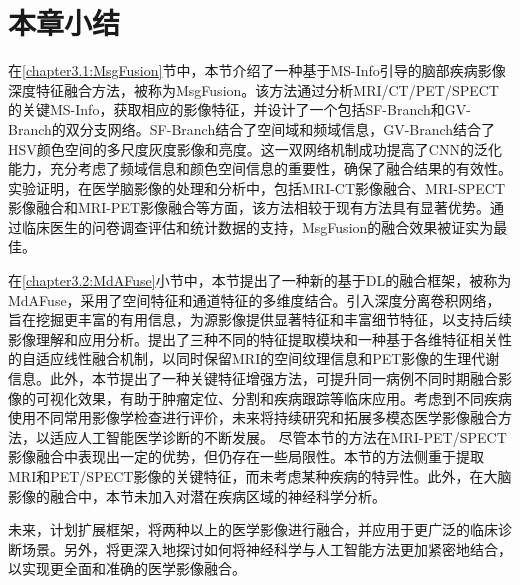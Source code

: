 \section{本章小结}
在\ref{chapter3.1:MsgFusion}节中，本节介绍了一种基于MS-Info引导的脑部疾病影像深度特征融合方法，被称为MsgFusion。该方法通过分析MRI/CT/PET/SPECT的关键MS-Info，获取相应的影像特征，并设计了一个包括SF-Branch和GV-Branch的双分支网络。SF-Branch结合了空间域和频域信息，GV-Branch结合了HSV颜色空间的多尺度灰度影像和亮度。这一双网络机制成功提高了CNN的泛化能力，充分考虑了频域信息和颜色空间信息的重要性，确保了融合结果的有效性。实验证明，在医学脑影像的处理和分析中，包括MRI-CT影像融合、MRI-SPECT影像融合和MRI-PET影像融合等方面，该方法相较于现有方法具有显著优势。通过临床医生的问卷调查评估和统计数据的支持，MsgFusion的融合效果被证实为最佳。

在\ref{chapter3.2:MdAFuse}小节中，本节提出了一种新的基于DL的融合框架，被称为MdAFuse，采用了空间特征和通道特征的多维度结合。引入深度分离卷积网络，旨在挖掘更丰富的有用信息，为源影像提供显著特征和丰富细节特征，以支持后续影像理解和应用分析。提出了三种不同的特征提取模块和一种基于各维特征相关性的自适应线性融合机制，以同时保留MRI的空间纹理信息和PET影像的生理代谢信息。此外，本节提出了一种关键特征增强方法，可提升同一病例不同时期融合影像的可视化效果，有助于肿瘤定位、分割和疾病跟踪等临床应用。考虑到不同疾病使用不同常用影像学检查进行评价，未来将持续研究和拓展多模态医学影像融合方法，以适应人工智能医学诊断的不断发展。
尽管本节的方法在MRI-PET/SPECT影像融合中表现出一定的优势，但仍存在一些局限性。本节的方法侧重于提取MRI和PET/SPECT影像的关键特征，而未考虑某种疾病的特异性。此外，在大脑影像的融合中，本节未加入对潜在疾病区域的神经科学分析。

未来，计划扩展框架，将两种以上的医学影像进行融合，并应用于更广泛的临床诊断场景。另外，将更深入地探讨如何将神经科学与人工智能方法更加紧密地结合，以实现更全面和准确的医学影像融合。

